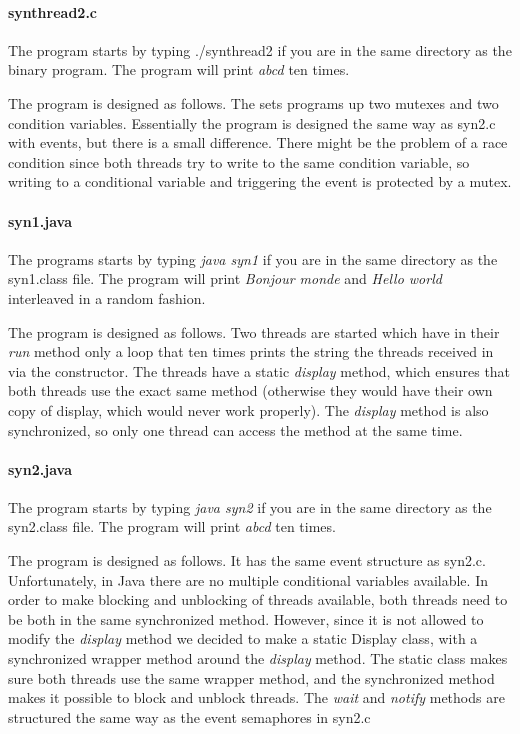 \documentclass[a4paper,10pt]{article}
\begin{document}
\paragraph{synthread2.c} The program starts by typing ./synthread2 if you are in the same directory as the binary program. The program will print \emph{abcd} ten times.

The program is designed as follows. The sets programs up two mutexes and two condition variables. Essentially the program is designed the same way as syn2.c with events, but there is a small difference. There might be the problem of a race condition since both threads try to write to the same condition variable, so writing to a conditional variable and triggering the event is protected by a mutex. 

\paragraph{syn1.java} The programs starts by typing \emph{java syn1} if you are in the same directory as the syn1.class file. The program will print \emph{Bonjour monde} and \emph{Hello world} interleaved in a random fashion.

The program is designed as follows. Two threads are started which have in their \emph{run} method only a loop that ten times prints the string the threads received in via the constructor. The threads have a static \emph{display} method, which ensures that both threads use the exact same method (otherwise they would have their own copy of display, which would never work properly). The \emph{display} method is also synchronized, so only one thread can access the method at the same time.

\paragraph{syn2.java} The program starts by typing \emph{java syn2} if you are in the same directory as the syn2.class file. The program will print \emph{abcd} ten times.

The program is designed as follows. It has the same event structure as syn2.c. Unfortunately, in Java there are no multiple conditional variables available. In order to make blocking and unblocking of threads available, both threads need to be both in the same synchronized method. However, since it is not allowed to modify the \emph{display} method we decided to make a static Display class, with a synchronized wrapper method around the \emph{display} method. The static class makes sure both threads use the same wrapper method, and the synchronized method makes it possible to block and unblock threads. The \emph{wait} and \emph{notify} methods are structured the same way as the event semaphores in syn2.c
\end{document}
